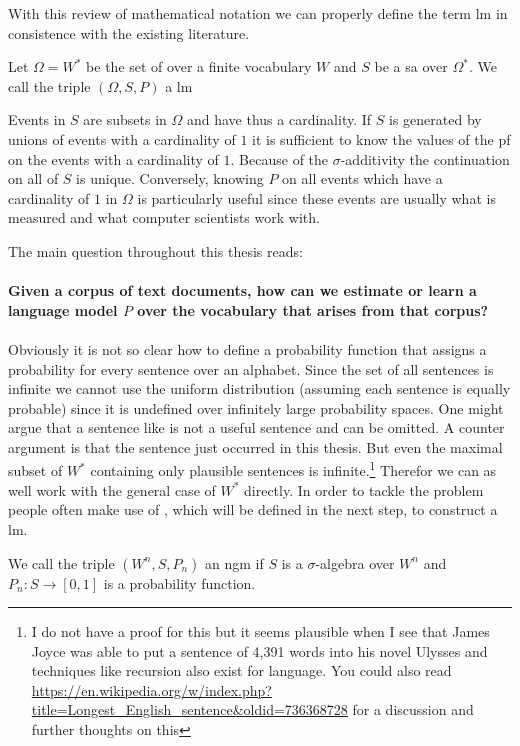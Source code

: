 \documentclass[•]{book}
\begin{document}
With this review of mathematical notation we can properly define the term \gls{lm} in consistence with the existing literature.

\begin{definition}\label{def:lm}
Let $\Omega = W^{*}$ be the set of  over a finite vocabulary $W$ and $S$ be a \gls{sa} over $\Omega^{*}$.
We call the triple $(\Omega, S, P)$ a \gls{lm}
\end{definition} 

\begin{example}\label{ex:continuation}
Events in $S$ are subsets in $\Omega$ and have thus a cardinality.
If $S$ is generated by unions of events with a cardinality of $1$ it is sufficient to know the values of the \gls{pf} on the events with a cardinality of $1$. Because of the $\sigma$-additivity the continuation on all of $S$ is unique.  
Conversely, knowing $P$ on all events which have a cardinality of $1$ in $\Omega$ is particularly useful since these events are usually what is measured and what computer scientists work with.
\end{example}

The main question throughout this thesis reads:\\
\\
\textbf{Given a corpus of text documents, how can we estimate or learn a language model $P$ over the vocabulary that arises from that corpus?} 
\\
\\
Obviously it is not so clear how to define a probability function that assigns a probability for every sentence over an alphabet. 
Since the set of all sentences is infinite we cannot use the uniform distribution (assuming each sentence is equally probable) since it is undefined over infinitely large probability spaces.  
One might argue that a sentence like  is not a useful sentence and can be omitted. 
A counter argument is that the sentence just occurred in this thesis. 
But even the maximal subset of $W^{*}$ containing only plausible sentences is infinite.\footnote{I do not have a proof for this but it seems plausible when I see that James Joyce was able to put a sentence of 4,391 words into his novel Ulysses and techniques like recursion also exist for language. You could also read \url{https://en.wikipedia.org/w/index.php?title=Longest_English_sentence&oldid=736368728} for a discussion and further thoughts on this}
Therefor we can as well work with the general case of $W^{*}$ directly. 
In order to tackle the problem people often make use of , which will be defined in the next step, to construct a \gls{lm}.  
\begin{definition}We call the triple $(W^{n}, S, P_n)$ an \gls{ngm} if $S$ is a $\sigma$-algebra over $W^{n}$ and $P_n:S\longrightarrow [0,1]$ is a probability function.  
\end{definition}
\end{document}
